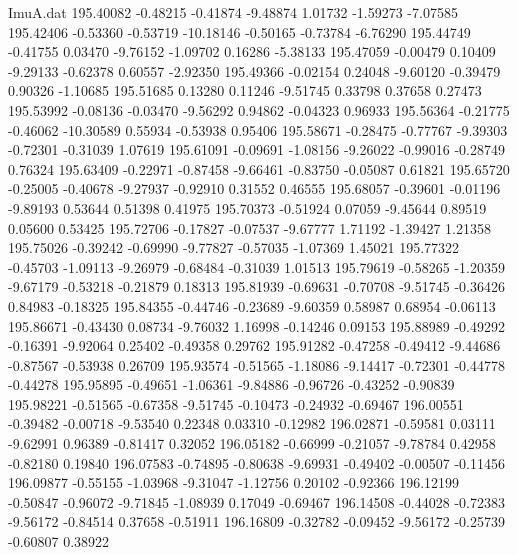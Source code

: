 \begin{filecontents}{ImuA.dat}
 195.40082   -0.48215   -0.41874   -9.48874    1.01732   -1.59273   -7.07585
 195.42406   -0.53360   -0.53719  -10.18146   -0.50165   -0.73784   -6.76290
 195.44749   -0.41755    0.03470   -9.76152   -1.09702    0.16286   -5.38133
 195.47059   -0.00479    0.10409   -9.29133   -0.62378    0.60557   -2.92350
 195.49366   -0.02154    0.24048   -9.60120   -0.39479    0.90326   -1.10685
 195.51685    0.13280    0.11246   -9.51745    0.33798    0.37658    0.27473
 195.53992   -0.08136   -0.03470   -9.56292    0.94862   -0.04323    0.96933
 195.56364   -0.21775   -0.46062  -10.30589    0.55934   -0.53938    0.95406
 195.58671   -0.28475   -0.77767   -9.39303   -0.72301   -0.31039    1.07619
 195.61091   -0.09691   -1.08156   -9.26022   -0.99016   -0.28749    0.76324
 195.63409   -0.22971   -0.87458   -9.66461   -0.83750   -0.05087    0.61821
 195.65720   -0.25005   -0.40678   -9.27937   -0.92910    0.31552    0.46555
 195.68057   -0.39601   -0.01196   -9.89193    0.53644    0.51398    0.41975
 195.70373   -0.51924    0.07059   -9.45644    0.89519    0.05600    0.53425
 195.72706   -0.17827   -0.07537   -9.67777    1.71192   -1.39427    1.21358
 195.75026   -0.39242   -0.69990   -9.77827   -0.57035   -1.07369    1.45021
 195.77322   -0.45703   -1.09113   -9.26979   -0.68484   -0.31039    1.01513
 195.79619   -0.58265   -1.20359   -9.67179   -0.53218   -0.21879    0.18313
 195.81939   -0.69631   -0.70708   -9.51745   -0.36426    0.84983   -0.18325
 195.84355   -0.44746   -0.23689   -9.60359    0.58987    0.68954   -0.06113
 195.86671   -0.43430    0.08734   -9.76032    1.16998   -0.14246    0.09153
 195.88989   -0.49292   -0.16391   -9.92064    0.25402   -0.49358    0.29762
 195.91282   -0.47258   -0.49412   -9.44686   -0.87567   -0.53938    0.26709
 195.93574   -0.51565   -1.18086   -9.14417   -0.72301   -0.44778   -0.44278
 195.95895   -0.49651   -1.06361   -9.84886   -0.96726   -0.43252   -0.90839
 195.98221   -0.51565   -0.67358   -9.51745   -0.10473   -0.24932   -0.69467
 196.00551   -0.39482   -0.00718   -9.53540    0.22348    0.03310   -0.12982
 196.02871   -0.59581    0.03111   -9.62991    0.96389   -0.81417    0.32052
 196.05182   -0.66999   -0.21057   -9.78784    0.42958   -0.82180    0.19840
 196.07583   -0.74895   -0.80638   -9.69931   -0.49402   -0.00507   -0.11456
 196.09877   -0.55155   -1.03968   -9.31047   -1.12756    0.20102   -0.92366
 196.12199   -0.50847   -0.96072   -9.71845   -1.08939    0.17049   -0.69467
 196.14508   -0.44028   -0.72383   -9.56172   -0.84514    0.37658   -0.51911
 196.16809   -0.32782   -0.09452   -9.56172   -0.25739   -0.60807    0.38922

\end{filecontents}
